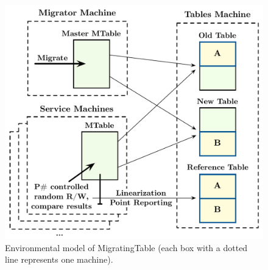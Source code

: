 
\begin{figure}[t]
\centering
\includegraphics[width=\linewidth]{img/mocked_migration}
\caption{Environmental model of MigratingTable (each box with a dotted line represents one \psharp machine).}
\label{fig:mockedmigration}
\end{figure}

